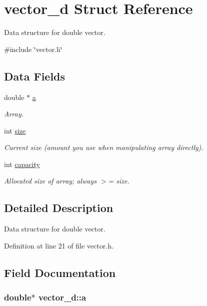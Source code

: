 \hypertarget{structvector__d}{\section{vector\-\_\-d \-Struct \-Reference}
\label{structvector__d}
}


\-Data structure for double vector.  




{\ttfamily \#include \char`\"{}vector.\-h\char`\"{}}

\subsection*{\-Data \-Fields}
\begin{DoxyCompactItemize}
\item 
double $\ast$ \hyperlink{structvector__d_a925832a4ece20022fbe241e7e38ec329}{a}
\begin{DoxyCompactList}\small\item\em \-Array. \end{DoxyCompactList}\item 
int \hyperlink{structvector__d_a0267fa83b14889786ec36cdbe78a71b3}{size}
\begin{DoxyCompactList}\small\item\em \-Current size (amount you use when manipulating array directly). \end{DoxyCompactList}\item 
int \hyperlink{structvector__d_acc924985e421a81b7acb5a2ee8eecfaa}{capacity}
\begin{DoxyCompactList}\small\item\em \-Allocated size of array; always $>$= size. \end{DoxyCompactList}\end{DoxyCompactItemize}


\subsection{\-Detailed \-Description}
\-Data structure for double vector. 



\-Definition at line 21 of file vector.\-h.



\subsection{\-Field \-Documentation}
\hypertarget{structvector__d_a925832a4ece20022fbe241e7e38ec329}{
\subsubsection[{a}]{\setlength{\rightskip}{0pt plus 5cm}double$\ast$ {\bf vector\-\_\-d\-::a}}}\label{structvector__d_a925832a4ece20022fbe241e7e38ec329}


